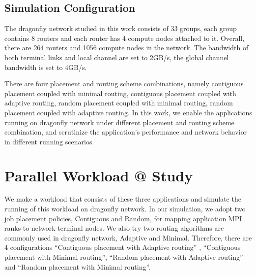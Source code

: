 \documentclass[conference,compsoc]{IEEEtran}
\makeatletter
\newcommand{\Rmnum}[1]{\expandafter\@slowromancap\romannumeral #1@}
\makeatother
\begin{document}
\subsection{Simulation Configuration}
\label{sec: simulation configuration}

The dragonfly network studied in this work consists of 33 groups, each group contains 8 routers and each router has 4 compute nodes attached to it. Overall, there are 264 routers and 1056 compute nodes in the network. The bandwidth of both terminal links and local channel are set to 2GB/s, the global channel bandwidth is set to 4GB/s. 

There are four placement and routing scheme combinations, namely contiguous placement coupled with minimal routing, contiguous placement coupled with adaptive routing, random placement coupled with minimal routing, random placement coupled with adaptive routing.  In this work, we enable the applications running on dragonfly network under different placement and routing scheme combination, and scrutinize the application's performance and network behavior in different running scenarios. 



\section{Parallel Workload \Rmnum{1 } Study}
\label{sec: workload 1 overview}

We make a workload that consists of these three applications and simulate the running of this workload on dragonfly network. In our simulation, we adopt two job placement policies, Contiguous and Random, for mapping application MPI ranks to network terminal nodes. We also try two routing algorithms are commonly used in dragonfly network, Adaptive and Minimal. Therefore, there are 4 configurations “Contiguous placement with Adaptive routing” , “Contiguous placement with Minimal routing”, “Random placement with  Adaptive routing” and “Random placement with Minimal routing”. 
\end{document}

